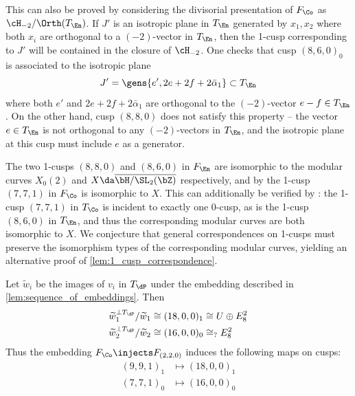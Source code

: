 \documentclass[../../main.tex]{subfiles}
\begin{document}
\begin{remark}
This can also be proved by considering the divisorial presentation of $F_{\Co}$ as $\cH_{-2}/\Orth(T_\En)$. If $J'$ is an isotropic plane in $T_\En$ generated by $x_1, x_2$ where both $x_i$ are orthogonal to a $(-2)$-vector in $T_\En$, then the 1-cusp corresponding to $J'$ will be contained in the closure of $\cH_{-2}$. One checks that cusp $(8, 6, 0)_0$ is associated to the isotropic plane 
$$
J' = \gens{e', 2e + 2f + 2\bar\alpha_1} \subset T_\En
$$ 
where both $e'$ and $2e + 2f + 2\bar\alpha_1$ are orthogonal to the $(-2)$-vector $e-f\in T_{\En}$. On the other hand, cusp $(8,8,0)$ does not satisfy this property -- the vector $e\in T_\En$ is not orthogonal to any $(-2)$-vectors in $T_\En$, and the isotropic plane at this cusp must include $e$ as a generator.
\end{remark}

\begin{remark}
The two 1-cusps $(8,8,0)$ and $(8,6,0)$ in $F_\En$ are isomorphic to the modular curves $X_0(2)$ and $X \da \overline{\bH / \SL_2(\bZ)}$ respectively, and by \cite[Cor. 5.9.10]{CD12} the 1-cusp $(7,7,1)$ in $F_\Co$ is isomorphic to $X$. This can additionally be verified by \cite[Prop. 5.13]{AE22}: the 1-cusp $(7,7,1)$ in $T_\Co$ is incident to exactly one 0-cusp, as is the 1-cusp $(8,6,0)$ in $T_\En$, and thus the corresponding modular curves are both isomorphic to $X$.
We conjecture that general correspondences on 1-cusps must preserve the isomorphism types of the corresponding modular curves, yielding an alternative proof of \cref{lem:1_cusp_correspondence}.
\end{remark}


\begin{lemma}\label{lem:cusp_map_dP}
Let $\tilde w_i$ be the images of $v_i$ in $T_\dP$ under the embedding described in \cref{lem:sequence_of_embeddings}. Then
\begin{align*}
    \tilde w_1^{\perp T_\dP}/\tilde w_1 &\cong (18, 0, 0)_1 \cong U \oplus E_8^2 \\
    \tilde w_2^{\perp T_\dP}/\tilde w_2 &\cong (16, 0, 0)_0 \cong_? E_8^2 \ 
\end{align*}
Thus the embedding $F_\Co \injects F_{(2,2,0)}$ induces the following maps on cusps:
\begin{align*}
    (9, 9, 1)_1 &\mapsto (18, 0, 0)_1 \\
    (7, 7, 1)_0 &\mapsto (16, 0, 0)_0
\end{align*}
\end{lemma}
\end{document}
